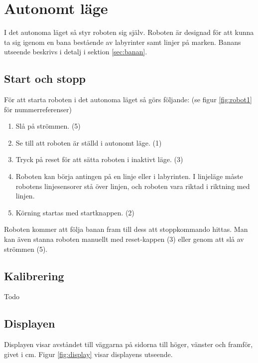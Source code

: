 
%
%

\section{Autonomt läge}
I det autonoma läget så styr roboten sig själv. Roboten är designad för att kunna ta sig igenom en bana bestående av labyrinter samt linjer på marken. Banans utseende beskrivs i detalj i sektion \ref{sec:banan}.

\subsection{Start och stopp}
För att starta roboten i det autonoma läget så görs följande: (se figur \ref{fig:robot1} för nummerreferenser)

\begin{enumerate}
\item Slå på strömmen. (5)
\item Se till att roboten är ställd i autonomt läge. (1)
\item Tryck på reset för att sätta roboten i inaktivt läge. (3)
\item Roboten kan börja antingen på en linje eller i labyrinten. I linjeläge måste robotens linjesensorer stå över linjen, och roboten vara riktad i riktning med linjen. 
\item Körning startas med startknappen. (2)
\end{enumerate}

Roboten kommer att följa banan fram till dess att stoppkommando hittas. Man kan även stanna roboten manuellt med reset-kappen (3) eller genom att slå av strömmen (5). 

\subsection{Kalibrering}
Todo

\subsection{Displayen}
Displayen visar avståndet till väggarna på sidorna till höger, vänster och framför, givet i cm. Figur \ref{fig:display} visar displayens utseende. 

